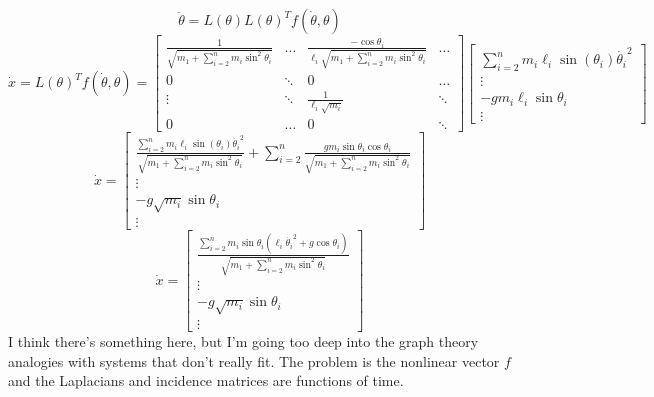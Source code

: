 \documentclass[conference]{IEEEtran}
\begin{document}
$$
\ddot{\theta}=L(\theta)L(\theta)^Tf(\dot{\theta},\theta)
$$
$$
\dot{x} = L(\theta)^Tf(\dot{\theta},\theta) = \begin{bmatrix}
    \frac{1}{\sqrt{m_1+\sum\limits_{i=2}^n m_i \sin^2\theta_i}} & \dots & \frac{-\cos\theta_i}{\ell_i\sqrt{m_1+\sum\limits_{i=2}^n m_i \sin^2\theta_i}} & \dots\\
    0 & \ddots & 0 & \dots\\
    \vdots & \ddots & \frac{1}{\ell_i\sqrt{m_i}} & \ddots\\
    0 & \dots & 0 & \ddots
\end{bmatrix}
\begin{bmatrix}
    \sum\limits_{i=2}^n m_i\ell_i\sin(\theta_i)\dot{\theta_i}^2\\
    \vdots\\
    -gm_i\ell_i\sin\theta_i\\
    \vdots
\end{bmatrix}
$$
$$
\dot{x} = \begin{bmatrix}
    \frac{\sum\limits_{i=2}^n m_i\ell_i\sin(\theta_i)\dot{\theta_i}^2}{\sqrt{m_1+\sum\limits_{i=2}^n m_i \sin^2\theta_i}}+
    \sum\limits_{i=2}^n \frac{gm_i\sin\theta_i \cos\theta_i}{\sqrt{m_1+\sum\limits_{i=2}^n m_i \sin^2\theta_i}}\\
    \vdots\\
    -g\sqrt{m_i}\sin\theta_i\\
    \vdots
\end{bmatrix}
$$
$$
\dot{x} = \begin{bmatrix}
    \frac{\sum\limits_{i=2}^n m_i\sin\theta_i(\ell_i\dot{\theta_i}^2 + g \cos\theta_i)}{\sqrt{m_1+\sum\limits_{i=2}^n m_i \sin^2\theta_i}}\\
    \vdots\\
    -g\sqrt{m_i}\sin\theta_i\\
    \vdots
\end{bmatrix}
$$
I think there's something here, but I'm going too deep into the graph theory analogies with systems that don't really fit. The problem is the nonlinear vector $f$ and the Laplacians and incidence matrices are functions of time.
\end{document}
